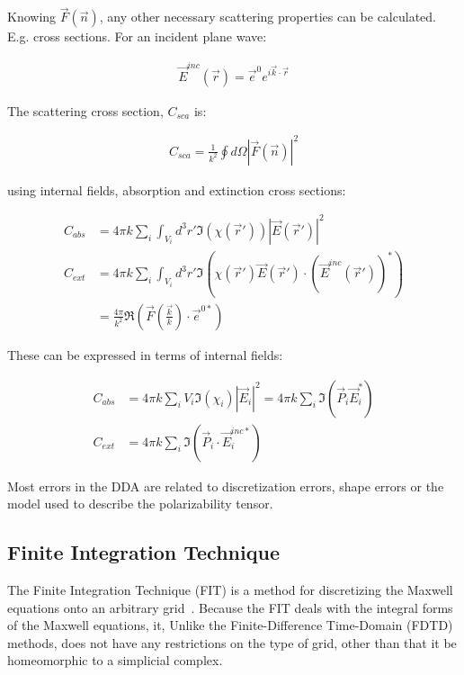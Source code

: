     Knowing $\vec{F}(\vec{n})$, any other necessary scattering properties can be calculated. E.g. cross sections. For
    an incident plane wave:

    \begin{align}
        \vec{E}^{inc}(\vec{r}) = \vec{e}^0 e^{i\vec{k}\cdot\vec{r}}
    \end{align}

    The scattering cross section, $C_{sca}$ is:

    \begin{align}
        C_{sca} = \frac{1}{k^2}\oint d\Omega \left|\vec{F}(\vec{n})\right|^2
    \end{align}

    using internal fields, absorption and extinction cross sections:

    \begin{align}
        C_{abs} &= 4\pi k \sum_i \int_{V_i} d^3r' \Im(\chi(\vec{r}'))\left|\vec{E}(\vec{r}')\right|^2\\
        C_{ext} &= 4\pi k \sum_i \int_{V_i} d^3r' \Im\left(\chi(\vec{r}')\vec{E}(\vec{r}')\cdot(\vec{E}^{inc}(\vec{r}'))^*\right) \\
        &= \frac{4\pi}{k^2}\Re\left(\vec{F}(\frac{\vec{k}}{k})\cdot\vec{e}^{0*}\right)
    \end{align}

    These can be expressed in terms of internal fields:

    \begin{align}
        C_{abs} &= 4\pi k \sum_i V_i \Im(\chi_i)|\vec{E}_i|^2 = 4\pi k \sum_i \Im(\vec{P}_i\vec{E}_i^*) \\
        C_{ext} &= 4\pi k \sum_i \Im (\vec{P}_i\cdot\vec{E}_i^{inc*})
    \end{align}

    Most errors in the DDA are related to discretization errors, shape errors or the model used to describe the polarizability tensor.



\subsection{Finite Integration Technique}
\label{ap:FIT}
    The Finite Integration Technique (FIT) is a method for discretizing the Maxwell equations onto an arbitrary
    grid~\cite{weiland2001discrete}.  Because the FIT deals with the integral forms of the Maxwell equations, it,
    Unlike the Finite-Difference Time-Domain (FDTD) methods, does not have any restrictions on the type of grid,
    other than that it be homeomorphic to a simplicial complex.

